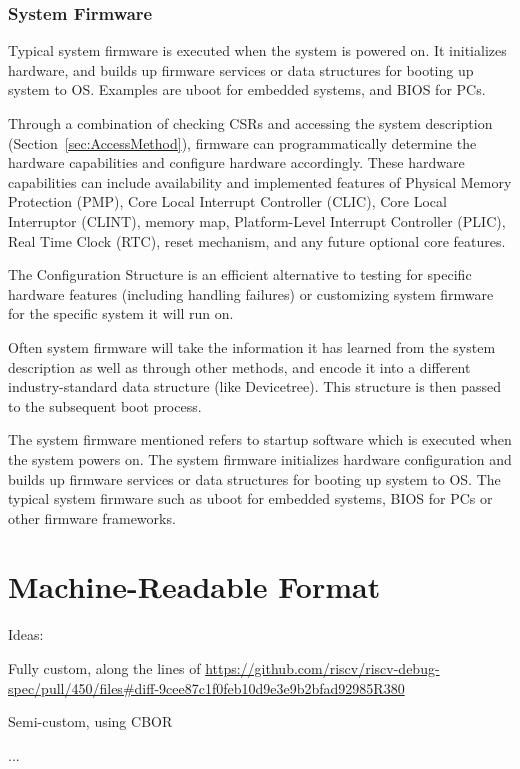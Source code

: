 \subsection{System Firmware}

Typical system firmware is executed when the system is powered on. It
initializes hardware, and builds up firmware services or data structures for
booting up system to OS. Examples are uboot for embedded systems, and BIOS for
PCs.

Through a combination of checking CSRs and
accessing the system description (Section~\ref{sec:AccessMethod}), firmware
can programmatically determine the hardware capabilities and configure hardware
accordingly.  These hardware capabilities can include availability and
implemented features of Physical Memory Protection (PMP), Core Local Interrupt
Controller (CLIC), Core Local Interruptor (CLINT), memory map, Platform-Level
Interrupt Controller (PLIC), Real Time Clock (RTC), reset mechanism, and any
future optional core features.

The Configuration Structure is an efficient alternative to testing for specific
hardware features (including handling failures) or customizing system firmware
for the specific system it will run on.

Often system firmware will take the information it has learned from the system
description as well as through other methods, and encode it into a different
industry-standard data structure (like Devicetree).  This structure is then
passed to the subsequent boot process.

\begin{commentary}
The system firmware mentioned refers to startup software which is executed
when the system powers on. The system firmware initializes hardware configuration and
builds up firmware services or data structures for booting up system to OS. The typical
system firmware such as uboot for embedded systems, BIOS for PCs or other firmware
frameworks.
\end{commentary}

\chapter{Machine-Readable Format}

\begin{steps}{Ideas:}
\item Fully custom, along the lines of
    \url{https://github.com/riscv/riscv-debug-spec/pull/450/files#diff-9cee87c1f0feb10d9e3e9b2bfad92985R380}
\item Semi-custom, using CBOR
\item ...
\end{steps}

